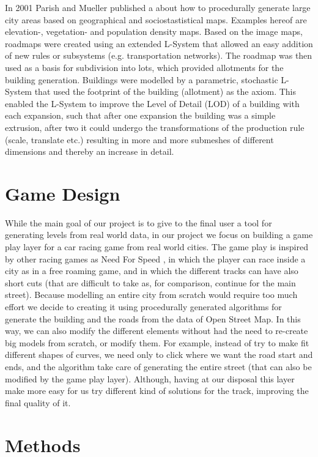 \documentclass[conference]{IEEEtran}
\begin{document}
In 2001 Parish and Mueller \cite{parish} published a about how to procedurally generate large city areas based on geographical and sociostastistical maps. Examples hereof are elevation-, vegetation- and population density maps. Based on the image maps, roadmaps were created using an extended L-System that allowed an easy addition of new rules or subsystems (e.g. transportation networks). The roadmap was then used as a basis for subdivision into lots, which provided allotments for the building generation. Buildings were modelled by a parametric, stochastic L-System that used the footprint of the building (allotment) as the axiom. This enabled the L-System to improve the Level of Detail (LOD) of a building with each expansion, such that after one expansion the building was a simple extrusion, after two it could undergo the transformations of the production rule (scale, translate etc.) resulting in more and more submeshes of different dimensions and thereby an increase in detail.


\section{Game Design}

While the main goal of our project is to give to the final user a tool for generating levels from real world data, in our project we focus on building a game play layer for a car racing game from real world cities. The game play is inspired by other racing games as Need For Speed \cite{nfs}, in which the player can race inside a city as in a free roaming game, and in which the different tracks can have also short cuts (that are difficult to take as, for comparison, continue for the main street). Because modelling an entire city from scratch would require too much effort we decide to creating it using procedurally generated algorithms for generate the building and the roads from the data of Open Street Map. In this way, we can also modify the different elements without had the need to re-create big models from scratch, or modify them. For example, instead of try to make fit different shapes of curves, we need only to click where we want the road start and ends, and the algorithm take care of generating the entire street (that can also be modified by the game play layer). Although, having at our disposal this layer make more easy for us try different kind of solutions for the track, improving the final quality of it. 

\section{Methods}
\end{document}
